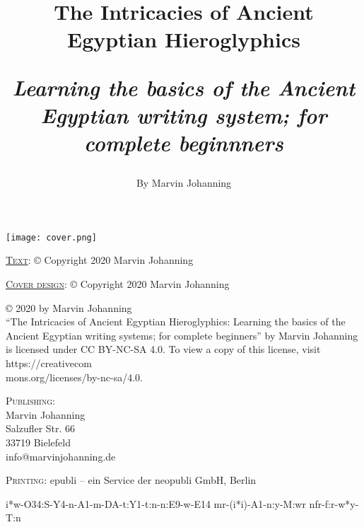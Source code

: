 \documentclass[a5paper,twoside,11pt]{report}
\begin{document}

\thispagestyle{empty}
\begin{center}
	\texttt{[image: cover.png]}
\end{center}
\newpage

\thispagestyle{empty}
  \mbox{}
  \newpage

\title{%
  The Intricacies of Ancient Egyptian Hieroglyphics\\
  \begin{center}
    \textit{Learning the basics of the Ancient Egyptian writing system; for complete beginnners}
  \end{center}
}
\author{By Marvin Johanning}
\date{}
\maketitle

\thispagestyle{empty}
\noindent\textsc{\underline{Text}}: © Copyright 2020 Marvin Johanning

\noindent\textsc{\underline{Cover design}}: © Copyright 2020 Marvin Johanning

\noindent© 2020 by Marvin Johanning\\``The Intricacies of Ancient Egyptian Hieroglyphics: Learning the basics of the Ancient Egyptian writing systems; for complete beginners'' by Marvin Johanning is licensed under CC BY-NC-SA 4.0. To view a copy of this license, visit https://creativecom\\mons.org/licenses/by-nc-sa/4.0.

\vspace{10mm}\noindent\textsc{Publishing}: \\
Marvin Johanning\\
Salzufler Str. 66\\
33719 Bielefeld\\
info@marvinjohanning.de

\vspace{5mm}\noindent\textsc{Printing}: epubli – ein Service der neopubli GmbH, Berlin
\newpage

\clearpage
\thispagestyle{empty}
\begin{center}
\DisplayHieroglyphs
\begin{hieroglyph}
	i*w-O34:S-Y4-n-A1-m-DA-t:Y1-t:n-n:E9-w-E14
	mr-(i*i)-A1-n:y-M:wr
	nfr-f:r-w*y-T:n
\end{hieroglyph}
\null\vfill
\vfill\vfill
\clearpage\newpage
\end{center}
\newpage
\end{document}
